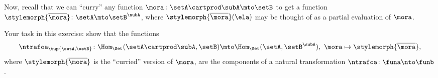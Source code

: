 \begin{gradedexercise}
    Now, recall that we can ``curry'' any function $\mora : \setA \cartprod \subA \mto \setB$ to get a function $\stylemorph{\overline{{\mora}}} \colon \setA \mto \setB^\subA$, where $\stylemorph{\overline{{\mora}}}(\ela)$ may be thought of as a partial evaluation of $\mora$.

    Your task in this exercise: show that the functions
    \begin{equation}
        \ntrafoa_{\tup{\setA, \setB}} \colon \Hom_\Set(\setA \cartprod \subA, \setB) \mto \Hom_\Set(\setA, \setB^\subA), \ \mora \mapsto \stylemorph{\overline{{\mora}}},
    \end{equation}
    where $\stylemorph{\overline{{\mora}}}$ is the ``curried'' version of $\mora$, are the components of a natural transformation $\ntrafoa \colon \funa \nto \funb$.
\end{gradedexercise}


